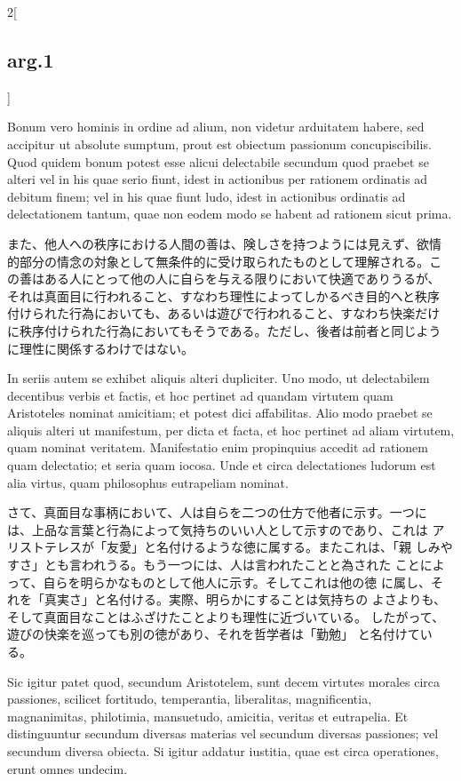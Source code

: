 \documentclass[paper=a4paper,fontsize=10pt,jafontsize=9pt,titlepage]{jlreq}
\begin{document}
\begin{paracol}{2}[\subsection{arg.1}]
\switchcolumn*

Bonum vero hominis in ordine ad alium, non videtur arduitatem habere,
 sed accipitur ut absolute sumptum, prout est obiectum passionum
 concupiscibilis. Quod quidem bonum potest esse alicui delectabile
 secundum quod praebet se alteri vel in his quae serio fiunt, idest in
 actionibus per rationem ordinatis ad debitum finem; vel in his quae
 fiunt ludo, idest in actionibus ordinatis ad delectationem tantum,
 quae non eodem modo se habent ad rationem sicut prima.

\switchcolumn

また、他人への秩序における人間の善は、険しさを持つようには見えず、欲情
的部分の情念の対象として無条件的に受け取られたものとして理解される。こ
の善はある人にとって他の人に自らを与える限りにおいて快適でありうるが、
それは真面目に行われること、すなわち理性によってしかるべき目的へと秩序
付けられた行為においても、あるいは遊びで行われること、すなわち快楽だけ
に秩序付けられた行為においてもそうである。ただし、後者は前者と同じよう
に理性に関係するわけではない。

\switchcolumn*

In seriis autem se exhibet aliquis alteri dupliciter. Uno modo, ut
 delectabilem decentibus verbis et factis, et hoc pertinet ad quandam
 virtutem quam Aristoteles nominat amicitiam; et potest dici
 affabilitas. Alio modo praebet se aliquis alteri ut manifestum, per
 dicta et facta, et hoc pertinet ad aliam virtutem, quam nominat
 veritatem. Manifestatio enim propinquius accedit ad rationem quam
 delectatio; et seria quam iocosa. Unde et circa delectationes ludorum
 est alia virtus, quam philosophus eutrapeliam nominat.

\switchcolumn

さて、真面目な事柄において、人は自らを二つの仕方で他者に示す。一つに
 は、上品な言葉と行為によって気持ちのいい人として示すのであり、これは
 アリストテレスが「友愛」と名付けるような徳に属する。またこれは、「親
 しみやすさ」とも言われうる。もう一つには、人は言われたことと為された
 ことによって、自らを明らかなものとして他人に示す。そしてこれは他の徳
 に属し、それを「真実さ」と名付ける。実際、明らかにすることは気持ちの
 よさよりも、そして真面目なことはふざけたことよりも理性に近づいている。
 したがって、遊びの快楽を巡っても別の徳があり、それを哲学者は「勤勉」
 と名付けている。

\switchcolumn*

Sic igitur patet quod, secundum Aristotelem, sunt decem virtutes
 morales circa passiones, scilicet fortitudo, temperantia,
 liberalitas, magnificentia, magnanimitas, philotimia, mansuetudo,
 amicitia, veritas et eutrapelia. Et distinguuntur secundum diversas
 materias vel secundum diversas passiones; vel secundum diversa
 obiecta. Si igitur addatur iustitia, quae est circa operationes,
 erunt omnes undecim.


\end{paracol}
\end{document}
